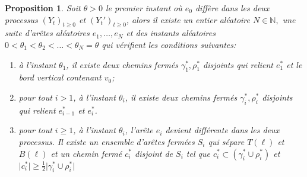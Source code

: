 \documentclass[titlepage,a4paper,12pt]{article}
\newcounter{prop}
\newtheorem{chaine}[prop]{Proposition}
\begin{document}
\begin{chaine}
\label{chaine}
Soit $\theta>0$ le premier instant où $e_0$ diffère dans les deux processus $(Y_t)_{t\geqslant 0}$ et $(Y_t')_{t\geqslant 0}$, alors il existe un entier aléatoire $N\in \mathbb{N},$ une suite d'arêtes aléatoires $e_1,\dots,e_N$ et des instants aléatoires $0<\theta_1< \theta_2<\dots<\theta_N=\theta$ qui vérifient les conditions suivantes:

\begin{enumerate}[leftmargin =*]
\item à l'instant $\theta_1$, il existe deux chemins fermés $\gamma_1^*,\rho_1^*$ disjoints qui relient $e_1^*$ et le bord vertical contenant $v_0$;

\item pour tout $i>1$, à l'instant $\theta_i$, il existe deux chemins fermés $\gamma_i^*,\rho_i^*$ disjoints qui relient $e_{i-1}^*$ et $e_i^*$.

\item pour tout $i\geqslant 1$, à l'instant $\theta_i$, l'arête $e_i$ devient différente dans les deux processus. Il existe un ensemble d'arêtes fermées $S_i$ qui sépare $T(\ell)$ et $B(\ell)$ et un chemin fermé $c^*_i$ disjoint de $S_i$ tel que $c_i^* \subset (\gamma_i^*\cup \rho_i^*)$ et $\vert c_i^*\vert \geqslant \frac{1}{2} \vert \gamma_i^*\cup \rho_i^* \vert$
\end{enumerate}

\end{chaine}
\end{document}
